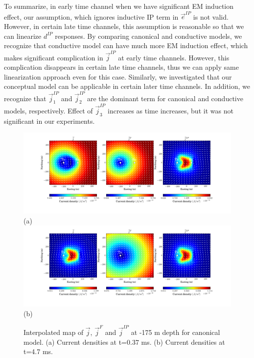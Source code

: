 \documentclass[a4paper, 11pt]{article}
\renewcommand {\j}  { {\vec j} }
\newcommand {\e}  { {\vec e} }
\begin{document}
To summarize, in early time channel when we have significant EM induction effect, our assumption, which ignores inductive IP term in $\e^{IP}$ is not valid. However, in certain late time channels, this assumption is reasonable so that we can linearize $d^{IP}$ responses. By comparing canonical and conductive models, we recognize that conductive model can have much more EM induction effect, which makes significant complication in $\j^{IP}$ at early time channels. However, this complication disappears in certain late time channels, thus we can apply same linearization approach even for this case. Similarly, we investigated that our conceptual model can be applicable in certain later time channels. In addition, we recognize that $\j^{IP}_1$ and $\j^{IP}_2$ are the dominant term for canonical and conductive models, respectively. Effect of $\j^{IP}_3$ increases as time increases, but it was not significant in our experiments.

\begin{figure}[htb]
  \centering
  \includegraphics[height=0.25\textheight]{figures/synthetic/CurrentEMIP_case1_ch20.png} \\
  (a) \\
  \includegraphics[height=0.25\textheight]{figures/synthetic/CurrentEMIP_case1_ch38.png} \\
  (b)
  \caption{Interpolated map of $\j$, $\j^F$ and $\j^{IP}$ at -175 m depth for canonical model. (a) Current densities at t=0.37 ms. (b)  Current densities at t=4.7 ms. }
  \label{F: currentEMIP_case1_plan}
\end{figure}
\end{document}
